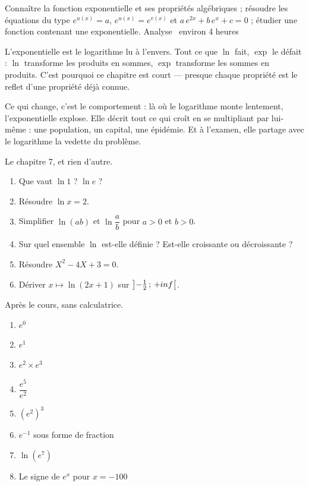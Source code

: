   {Connaître la fonction exponentielle et ses propriétés algébriques ;
   résoudre les équations du type $e^{u(x)} = a$, $e^{u(x)} = e^{v(x)}$ et
   $a\,e^{2x}+b\,e^{x}+c = 0$ ; étudier une fonction contenant une
   exponentielle.}
  {Analyse \textbullet\ environ 4 heures}

L'exponentielle est le logarithme lu à l'envers. Tout ce que $\ln$ fait,
$\exp$ le défait : $\ln$ transforme les produits en sommes, $\exp$ transforme
les sommes en produits. C'est pourquoi ce chapitre est court — presque chaque
propriété est le reflet d'une propriété déjà connue.

Ce qui change, c'est le comportement : là où le logarithme monte lentement,
l'exponentielle explose. Elle décrit tout ce qui croît en se multipliant par
lui-même : une population, un capital, une épidémie. Et à l'examen, elle
partage avec le logarithme la vedette du problème.

\begin{revision}
Le chapitre 7, et rien d'autre.

\begin{enumerate}[label=\textbf{\arabic*.}, leftmargin=*, itemsep=0.35em]
  \item Que vaut $\ln 1$ ? $\ln e$ ?
  \item Résoudre $\ln x = 2$.
  \item Simplifier $\ln(a b)$ et $\ln\dfrac ab$ pour $a>0$ et $b>0$.
  \item Sur quel ensemble $\ln$ est-elle définie ? Est-elle croissante ou
        décroissante ?
  \item Résoudre $X^{2}-4X+3 = 0$.
  \item Dériver $x \mapsto \ln(2x+1)$ sur $\left]-\frac12\,;\,+inf\right[$.
\end{enumerate}
\end{revision}

\begin{automatismes}
Après le cours, sans calculatrice.

\begin{enumerate}[label=\textbf{\alph*)}, leftmargin=*, itemsep=0.25em]
  \item $e^{0}$
  \item $e^{1}$
  \item $e^{2}\times e^{3}$
  \item $\dfrac{e^{5}}{e^{2}}$
  \item $\left(e^{2}\right)^{3}$
  \item $e^{-1}$ sous forme de fraction
  \item $\ln\left(e^{7}\right)$
  \item Le signe de $e^{x}$ pour $x = -100$
\end{enumerate}
\end{automatismes}

